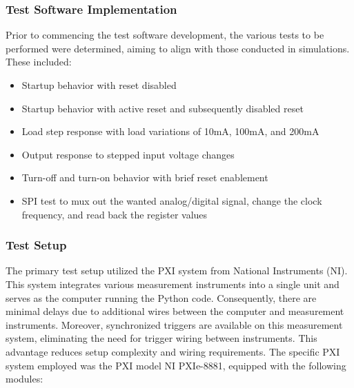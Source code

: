 \subsubsection{Test Software Implementation}
Prior to commencing the test software development, the various tests to be performed were determined, aiming to align with those conducted in simulations. These included:
\begin{itemize}
    \item Startup behavior with reset disabled
    \item Startup behavior with active reset and subsequently disabled reset
    \item Load step response with load variations of 10mA, 100mA, and 200mA
    \item Output response to stepped input voltage changes
    \item Turn-off and turn-on behavior with brief reset enablement
    \item SPI test to mux out the wanted analog/digital signal, change the clock frequency, and read back the register values
\end{itemize}

\subsubsection{Test Setup}
The primary test setup utilized the PXI system from National Instruments (NI). This system integrates various measurement instruments into a single unit and serves as the computer running the Python code. Consequently, there are minimal delays due to additional wires between the computer and measurement instruments. Moreover, synchronized triggers are available on this measurement system, eliminating the need for trigger wiring between instruments. This advantage reduces setup complexity and wiring requirements. The specific PXI system employed was the PXI model \glqq{}NI PXIe-8881\grqq{}, equipped with the following modules:

